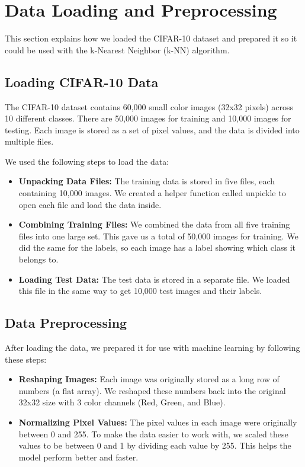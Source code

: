 \documentclass[lettersize,journal]{IEEEtran}
\begin{document}
\section{Data Loading and Preprocessing}

This section explains how we loaded the CIFAR-10 dataset and prepared it so it could be used with the k-Nearest Neighbor (k-NN) algorithm.

\subsection{\textbf{Loading CIFAR-10 Data}}
The CIFAR-10 dataset contains 60,000 small color images (32x32 pixels) across 10 different classes. There are 50,000 images for training and 10,000 images for testing. Each image is stored as a set of pixel values, and the data is divided into multiple files.

We used the following steps to load the data:
\begin{itemize}
    \item \textbf{Unpacking Data Files:} The training data is stored in five files, each containing 10,000 images. We created a helper function called unpickle to open each file and load the data inside.
    \item \textbf{Combining Training Files:} We combined the data from all five training files into one large set. This gave us a total of 50,000 images for training. We did the same for the labels, so each image has a label showing which class it belongs to.
    \item \textbf{Loading Test Data:} The test data is stored in a separate file. We loaded this file in the same way to get 10,000 test images and their labels.
\end{itemize}

\subsection{\textbf{Data Preprocessing}}
After loading the data, we prepared it for use with machine learning by following these steps:

\begin{itemize}
    \item \textbf{Reshaping Images:} Each image was originally stored as a long row of numbers (a flat array). We reshaped these numbers back into the original 32x32 size with 3 color channels (Red, Green, and Blue).
    \item \textbf{Normalizing Pixel Values:} The pixel values in each image were originally between 0 and 255. To make the data easier to work with, we scaled these values to be between 0 and 1 by dividing each value by 255. This helps the model perform better and faster.
\end{itemize}
\end{document}
